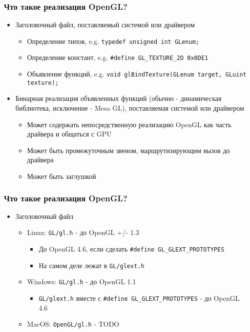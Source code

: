 \documentclass{beamer}
\begin{document}
\begin{frame}[fragile]
\frametitle{Что такое реализация OpenGL?}
\begin{itemize}
\item Заголовочный файл, поставляемый системой или драйвером
\begin{itemize}
\item Определение типов, e.g. \verb|typedef unsigned int GLenum;|
\item Определение констант, e.g. \verb|#define GL_TEXTURE_2D 0x0DE1|
\item Объявление функций, e.g. \verb|void glBindTexture(GLenum target, GLuint texture);|
\end{itemize}
\pause
\item Бинарная реализация объявленных функций (обычно - динамическая библиотека, исключение - Mesa GL), поставляемая системой или драйвером
\begin{itemize}
\item Может содержать непосредственную реализацию OpenGL как часть драйвера и общаться с GPU
\item Может быть промежуточным звеном, маршрутизирующим вызов до драйвера
\item Может быть заглушкой
\end{itemize}
\end{itemize}
\end{frame}

\begin{frame}[fragile]
\frametitle{Что такое реализация OpenGL?}
\begin{itemize}
\item Заголовочный файл
\begin{itemize}
\item Linux: \verb|GL/gl.h| - до OpenGL +/- 1.3
\begin{itemize}
\item До OpenGL 4.6, если сделать \verb|#define GL_GLEXT_PROTOTYPES|
\item На самом деле лежат в \verb|GL/glext.h|
\end{itemize}
\pause
\item Windows: \verb|GL/gl.h| - до OpenGL 1.1
\begin{itemize}
\item \verb|GL/glext.h| вместе с \verb|#define GL_GLEXT_PROTOTYPES| - до OpenGL 4.6
\end{itemize}
\pause
\item MacOS: \verb|OpenGL/gl.h| - TODO
\end{itemize}
\end{itemize}
\end{frame}
\end{document}
